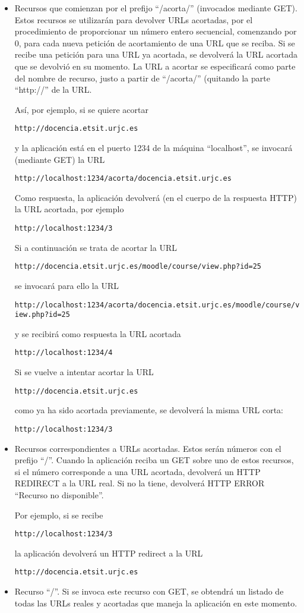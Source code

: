 \begin{itemize}
\item Recursos que comienzan por el prefijo ``/acorta/'' (invocados mediante GET). Estos recursos se utilizarán para devolver URLs acortadas, por el procedimiento de proporcionar un número entero secuencial, comenzando por 0, para cada nueva petición de acortamiento de una URL que se reciba. Si se recibe una petición para una URL ya acortada, se devolverá la URL acortada que se devolvió en su momento. La URL a acortar se especificará como parte del nombre de recurso, justo a partir de ``/acorta/'' (quitando la parte ``http://'' de la URL.

Así, por ejemplo, si se quiere acortar

\verb|http://docencia.etsit.urjc.es|

y la aplicación está en el puerto 1234 de la máquina ``localhost'', se invocará (mediante GET) la URL

\verb|http://localhost:1234/acorta/docencia.etsit.urjc.es|

Como respuesta, la aplicación devolverá (en el cuerpo de la respuesta HTTP) la URL acortada, por ejemplo

\verb|http://localhost:1234/3|

Si a continuación se trata de acortar la URL

\verb|http://docencia.etsit.urjc.es/moodle/course/view.php?id=25|

se invocará para ello la URL

\verb|http://localhost:1234/acorta/docencia.etsit.urjc.es/moodle/course/view.php?id=25|

y se recibirá como respuesta la URL acortada

\verb|http://localhost:1234/4|

Si se vuelve a intentar acortar la URL

\verb|http://docencia.etsit.urjc.es|

como ya ha sido acortada previamente, se devolverá la misma URL corta:

\verb|http://localhost:1234/3|

\item Recursos correspondientes a URLs acortadas. Estos serán números con el prefijo ``/''. Cuando la aplicación reciba un GET sobre uno de estos recursos, si el número corresponde a una URL acortada, devolverá un HTTP REDIRECT a la URL real. Si no la tiene, devolverá HTTP ERROR ``Recurso no disponible''.

Por ejemplo, si se recibe 

\verb|http://localhost:1234/3|

la aplicación devolverá un HTTP redirect a la URL

\verb|http://docencia.etsit.urjc.es|

\item Recurso ``/''. Si se invoca este recurso con GET, se obtendrá un listado de todas las URLs reales y acortadas que maneja la aplicación en este momento.
\end{itemize}

